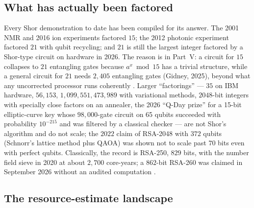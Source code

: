 \subsection{What has actually been factored}

Every Shor demonstration to date has been compiled for its answer. The 2001 NMR and 2016 ion
experiments factored $15$; the 2012 photonic experiment factored $21$ with qubit recycling; and
$21$ is still the largest integer factored by a Shor-type circuit on hardware in 2026. The reason
is in Part~V: a circuit for $15$ collapses to $21$ entangling gates because $a^x\bmod15$ has a
trivial structure, while a general circuit for $21$ needs $2,405$ entangling gates
(Gidney, 2025), beyond what any uncorrected processor runs coherently
\cite{ph:uqt26}. Larger ``factorings'' --- $35$ on IBM hardware, $56,153$, $1,099,551,473,989$
with variational methods, $2048$-bit integers with specially close factors on an annealer, the
2026 ``Q-Day prize'' for a 15-bit elliptic-curve key whose $98,000$-gate circuit on 65 qubits
succeeded with probability $10^{-215}$ and was filtered by a classical checker --- are not Shor's
algorithm and do not scale; the $2022$ claim of RSA-2048 with $372$ qubits (Schnorr's lattice
method plus QAOA) was shown not to scale past $70$ bits even with perfect qubits. Classically,
the record is RSA-250, $829$ bits, with the number field sieve in 2020 at about $2,700$
core-years; a $862$-bit RSA-260 was claimed in September 2026 without an audited computation
\cite{ph:uqt26}.

\subsection{The resource-estimate landscape}

